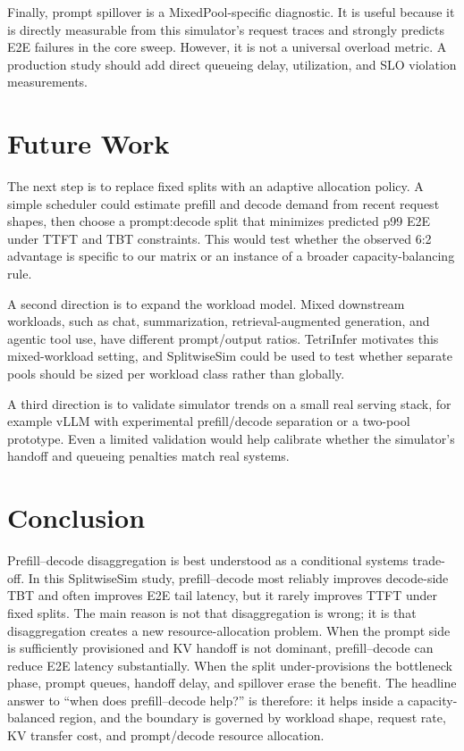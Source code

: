 \documentclass[10pt]{article}
\newcommand{\pd}{prefill--decode}
\begin{document}
Finally, prompt spillover is a MixedPool-specific diagnostic. It is useful because it is directly measurable from this simulator's request traces and strongly predicts E2E failures in the core sweep. However, it is not a universal overload metric. A production study should add direct queueing delay, utilization, and SLO violation measurements.

\section{Future Work}
The next step is to replace fixed splits with an adaptive allocation policy. A simple scheduler could estimate prefill and decode demand from recent request shapes, then choose a prompt:decode split that minimizes predicted p99 E2E under TTFT and TBT constraints. This would test whether the observed 6:2 advantage is specific to our matrix or an instance of a broader capacity-balancing rule.

A second direction is to expand the workload model. Mixed downstream workloads, such as chat, summarization, retrieval-augmented generation, and agentic tool use, have different prompt/output ratios. TetriInfer motivates this mixed-workload setting, and SplitwiseSim could be used to test whether separate pools should be sized per workload class rather than globally.

A third direction is to validate simulator trends on a small real serving stack, for example vLLM with experimental prefill/decode separation or a two-pool prototype. Even a limited validation would help calibrate whether the simulator's handoff and queueing penalties match real systems.

\section{Conclusion}
Prefill--decode disaggregation is best understood as a conditional systems trade-off. In this SplitwiseSim study, \pd{} most reliably improves decode-side TBT and often improves E2E tail latency, but it rarely improves TTFT under fixed splits. The main reason is not that disaggregation is wrong; it is that disaggregation creates a new resource-allocation problem. When the prompt side is sufficiently provisioned and KV handoff is not dominant, \pd{} can reduce E2E latency substantially. When the split under-provisions the bottleneck phase, prompt queues, handoff delay, and spillover erase the benefit. The headline answer to ``when does \pd{} help?'' is therefore: it helps inside a capacity-balanced region, and the boundary is governed by workload shape, request rate, KV transfer cost, and prompt/decode resource allocation.



\end{document}
